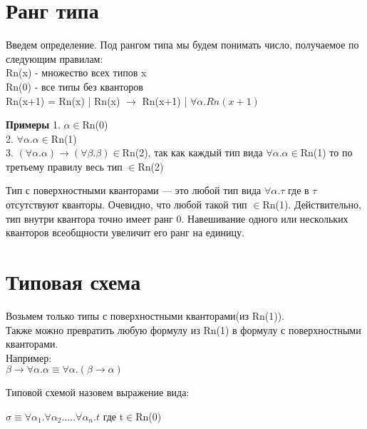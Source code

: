 	\section{Ранг типа}
	\begin{definition}
		 Введем определение. Под {рангом типа} мы будем понимать число, получаемое по следующим правилам: \\
	    Rn(x) - множество всех типов x\\
	    Rn(0) - все типы без кванторов\\
	    Rn(x+1) = Rn(x) | Rn(x) $\rightarrow$ Rn(x+1) | $\forall\alpha.Rn(x+1)$
	\end{definition}
	 
	\textbf{Примеры}
	 1. $ \alpha\in $Rn(0) \\
	 2. $ \forall\alpha.\alpha \in$Rn(1)\\
	 3. $ (\forall\alpha.\alpha)\rightarrow(\forall\beta.\beta) \in$Rn(2), так как каждый тип вида $ \forall\alpha.\alpha \in$Rn(1) то по третьему правилу весь тип $ \in $Rn(2) \\

	\begin{definition}
		Тип с поверхностными кванторами — это любой тип вида $ \forall\alpha.\tau $ где в $ \tau $ отсутствуют кванторы. Очевидно, что любой такой тип $ \in $Rn(1). Действительно, тип внутри квантора точно имеет ранг 0. Навешивание одного или нескольких кванторов всеобщности увеличит его ранг на единицу.
	\end{definition}
	 
	 \section{Типовая схема}
	 Возьмем только типы с поверхностными кванторами(из Rn(1)). \\
	 Также можно превратить любую формулу из Rn(1) в формулу с поверхностными кванторами. \\
	 Например:\\ 
	 $ \beta\rightarrow\forall\alpha.\alpha\equiv\forall\alpha.(\beta\rightarrow\alpha) $
	 \\
	 
	 \begin{definition}
	 	{Типовой схемой} назовем выражение вида: 

\begin{center}
		 $ \sigma\equiv\forall\alpha_1.\forall\alpha_2.....\forall\alpha_n.t $ где t$ \in $Rn(0)
\end{center}
	 	 \end{definition}
 	 
